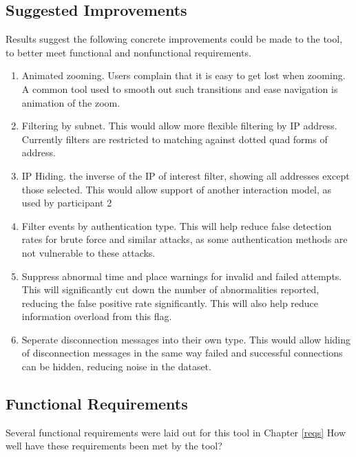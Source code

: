 \subsection {Suggested Improvements}
Results suggest the following concrete improvements could be made to the tool, to better meet functional and nonfunctional requirements. 

\begin{enumerate}
\item{Animated zooming. Users complain that it is easy to get lost when zooming. A common tool used to smooth out such transitions and ease navigation is animation of the zoom.}
\item{Filtering by subnet. This would allow more flexible filtering by IP address. Currently filters are restricted to matching against dotted quad forms of address.}
\item{IP Hiding. the inverse of the IP of interest filter, showing all addresses except those selected. This would allow support of another interaction model, as used by participant 2}
\item{Filter events by authentication type. This will help reduce false detection rates for brute force and similar attacks, as some authentication methods are not vulnerable to these attacks.}
\item{Suppress abnormal time and place warnings for invalid and failed attempts. This will significantly cut down the number of abnormalities reported, reducing the false positive rate significantly. This will also help reduce information overload from this flag.}
\item{Seperate disconnection messages into their own type. This would allow hiding of disconnection messages in the same way failed and successful connections can be hidden, reducing noise in the dataset.}
\end{enumerate}

\subsection{Functional Requirements}
Several functional requirements were laid out for this tool in Chapter \ref{reqs}
How well have these requirements been met by the tool?

